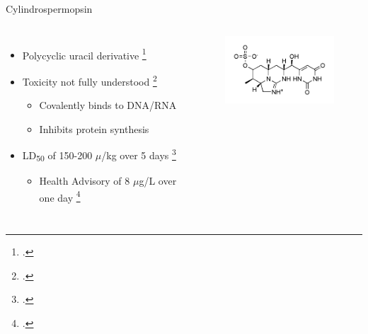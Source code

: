\begin{frame}{Cylindrospermopsin}

\begin{columns}
	\begin{itemize}
		\item Polycyclic uracil derivative \footcite{moreira_cylindrospermopsin:_2013} 
		\item Toxicity not fully understood  \footcite{kittler_1._2014}
			\begin{itemize}
				\item Covalently binds to DNA/RNA 
				\item Inhibits protein synthesis %
			\end{itemize}
		\item LD\textsubscript{50} of 150-200 $\mu$/kg over 5 days \footcite{shaw_cylindrospermopsin_2000}
			\begin{itemize}
				\item Health Advisory of 8 $\mu$g/L over one day \footcite{usepa_draft_2016}
			\end{itemize}
	\end{itemize}
	\begin{figure}
		\hspace*{-10cm}
		\centering
		\includegraphics[width=2in]{cylindro.png}
	\end{figure}
\end{columns}
\end{frame}
